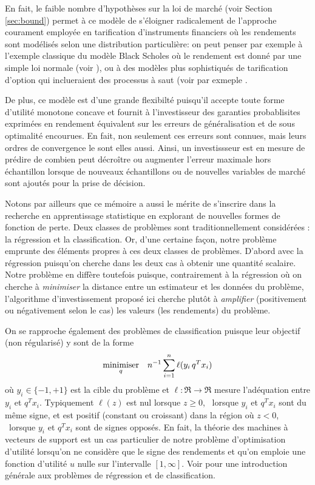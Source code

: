 En fait, le faible nombre d'hypothèses sur la loi de marché (voir Section \ref{sec:bound})
permet à ce modèle de s'éloigner radicalement de l'approche courament employée en
tarification d'instruments financiers où les rendements sont modélisés selon une
distribution particulière: on peut penser par exemple à l'exemple classique du modèle
Black Scholes où le rendement est donné par une simple loi normale (voir
\cite{shreve2004stochastic}), ou à des modèles plus sophistiqués de tarification d'option
qui inclueraient des processus à saut (voir par exmeple \cite{madan1998variance}.

De plus, ce modèle est d'une grande flexibilté puisqu'il accepte toute forme d'utilité
monotone concave et fournit à l'investisseur des garanties probablisites exprimées en
rendement équivalent sur les erreurs de généralisation et de sous optimalité encourues. En
fait, non seulement ces erreurs sont connues, mais leurs ordres de convergence le sont
elles aussi. Ainsi, un investissseur est en mesure de prédire de combien peut décroître ou
augmenter l'erreur maximale hors échantillon lorsque de nouveaux échantillons ou de
nouvelles variables de marché sont ajoutés pour la prise de décision.

Notons par ailleurs que ce mémoire a aussi le mérite de s'inscrire dans la recherche en
apprentissage statistique en explorant de nouvelles formes de fonction de perte. Deux
classes de problèmes sont traditionnellement considérées : la régression et la
classification. Or, d'une certaine façon, notre problème emprunte des éléments propres à
ces deux classes de problèmes. D'abord avec la régression puisqu'on cherche dans les deux
cas à obtenir une quantité scalaire. Notre problème en diffère toutefois puisque,
contrairement à la régression où on cherche à \textit{minimiser} la distance entre un
estimateur et les données du problème, l'algorithme d'investissement proposé ici cherche
plutôt à \textit{amplifier} (positivement ou négativement selon le cas) les valeurs (les
rendements) du problème. 

On se rapproche également des problèmes de classification puisque leur objectif (non
régularisé) y sont de la forme
\begin{equation}
  \minimizeEquation[q]{n^{-1}\sumi\ell(y_i\,q^Tx_i)}
\end{equation}
où $y_i\in\{-1,+1\}$ est la cible du problème et $\ell:\Re\to\Re$ mesure l'adéquation entre
$y_i$ et $q^Tx_i$. Typiquement $\ell(z)$ est nul lorsque $z\ge0$, \ie\ lorsque $y_i$ et
$q^Tx_i$ sont du même signe, et est positif (constant ou croissant) dans la région où
$z<0$, \ie\ lorsque $y_i$ et $q^Tx_i$ sont de signes opposés. En fait, la théorie des
machines à vecteurs de support est un cas particulier de notre problème d'optimisation
d'utilité lorsqu'on ne considère que le signe des rendements et qu'on emploie une fonction
d'utilité $u$ nulle sur l'intervalle $[1,\infty]$. Voir \cite{mohri2012foundations} pour une
introduction générale aux problèmes de régression et de classification.

